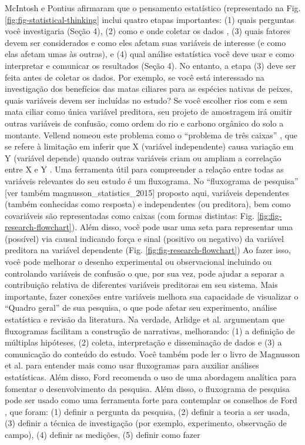 \documentclass[
]{book}
\begin{document}
McIntosh e Pontius \citeyearpar{mcintosh_science_2017} afirmaram que o pensamento estatístico (representado na Fig. \ref{fig:fig-statistical-thinking} inclui quatro etapas importantes: (1) quais perguntas você investigaria (Seção 4), (2) como e onde coletar os dados \citep{ruxton_experimental_2016}, (3) quais fatores devem ser considerados e como eles afetam suas variáveis de interesse (e como elas afetam umas às outras), e (4) qual análise estatística você deve usar e como interpretar e comunicar os resultados (Seção 4). No entanto, a etapa (3) deve ser feita antes de coletar os dados. Por exemplo, se você está interessado na investigação dos benefícios das matas ciliares para as espécies nativas de peixes, quais variáveis devem ser incluídas no estudo? Se você escolher rios com e sem mata ciliar como única variável preditora, seu projeto de amostragem irá omitir outras variáveis de confusão, como ordem do rio e carbono orgânico do solo a montante. Vellend \citeyearpar{vellend_theory_2016} nomeou este problema como o ``problema de três caixas'' \citep[ver também][]{ruxton_experimental_2016} , que se refere à limitação em inferir que X (variável independente) causa variação em Y (variável depende) quando outras variáveis criam ou ampliam a correlação entre X e Y \citep[ver Fig. 2 em][]{ruxton_experimental_2016}. Uma ferramenta útil para compreender a relação entre todas as variáveis relevantes do seu estudo é um fluxograma. No ``fluxograma de pesquisa'' {[}ver também magnusson\_statistics\_2015{]} proposto aqui, variáveis dependentes (também conhecidas como resposta) e independentes (ou preditora), bem como covariáveis são representadas como caixas (com formas distintas: Fig. \ref{fig:fig-research-flowchart}). Além disso, você pode usar uma seta para representar uma (possível) via causal indicando força e sinal (positivo ou negativo) da variável preditora na variável dependente (Fig. \ref{fig:fig-research-flowchart}) Ao fazer isso, você pode melhorar o desenho experimental ou observacional incluindo ou controlando variáveis de confusão o que, por sua vez, pode ajudar a separar a contribuição relativa de diferentes variáveis preditoras em seu sistema. Mais importante, fazer conexões entre variáveis melhora sua capacidade de visualizar o ``Quadro geral'' de sua pesquisa, o que pode afetar seu experimento, análise estatística e revisão da literatura. Na verdade, Arlidge et al. \citeyearpar{arlidge_using_2017}argumentam que fluxogramas facilitam a construção de narrativas, melhorando: (1) a definição de múltiplas hipóteses, (2) coleta, interpretação e disseminação de dados e (3) a comunicação do conteúdo do estudo. Você também pode ler o livro de Magnusson et al. \citeyearpar{magnusson_statistics_2015} para entender mais como usar fluxogramas para auxiliar análises estatísticas. Além disso, Ford \citeyearpar{ford_scientific_2004} recomenda o uso de uma abordagem analítica para fomentar o desenvolvimento da pesquisa. Além disso, o fluxograma de pesquisa pode ser usado como uma ferramenta forte para contemplar os conselhos de Ford \citeyearpar{ford_scientific_2004}, que foram: (1) definir a pergunta da pesquisa, (2) definir a teoria a ser usada, (3) definir a técnica de investigação (por exemplo, experimento, observação de campo), (4) definir as medições, (5) definir como fazer 
\end{document}
